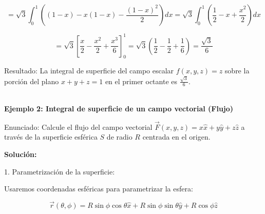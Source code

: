 \documentclass{article}
\begin{document}
\[
= \sqrt{3} \int_0^1 \left( (1-x) - x(1-x) - \frac{(1-x)^2}{2} \right) dx = \sqrt{3} \int_0^1 \left( \frac{1}{2} - x + \frac{x^2}{2} \right) dx
\]

\[
= \sqrt{3} \left[ \frac{x}{2} - \frac{x^2}{2} + \frac{x^3}{6} \right]_0^1 = \sqrt{3} \left( \frac{1}{2} - \frac{1}{2} + \frac{1}{6} \right) = \frac{\sqrt{3}}{6}
\]

Resultado: La integral de superficie del campo escalar $f(x, y, z) = z$ sobre la porción del plano $x + y + z = 1$ en el primer octante es $\frac{\sqrt{3}}{6}$.

\begin{center}
\label{fig:ejemplo_sup_escalar}

\end{center}\\

\textbf{Ejemplo 2: Integral de superficie de un campo vectorial (Flujo)}

Enunciado: Calcule el flujo del campo vectorial $\vec{F}(x, y, z) = x\hat{x} + y\hat{y} + z\hat{z}$ a través de la superficie esférica $S$ de radio $R$ centrada en el origen.

\textbf{Solución:}

1. Parametrización de la superficie:

Usaremos coordenadas esféricas para parametrizar la esfera:

\[
\vec{r}(\theta, \phi) = R\sin\phi\cos\theta\hat{x} + R\sin\phi\sin\theta\hat{y} + R\cos\phi\hat{z}
\]
\end{document}
